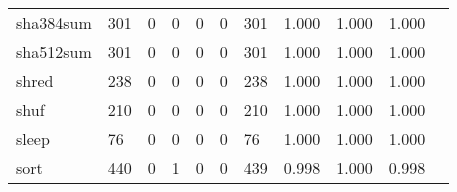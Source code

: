 \begin{longtable}{lp{1.2cm}p{1.2cm}p{1.2cm}p{1.2cm}p{1.2cm}p{1.2cm}p{1.2cm}p{1.2cm}p{1.2cm}p{1.2cm}}
sha384sum &                                   301 &                                                  0 &                                                  0 &                                                  0 &                                                  0 &                                                301 &                                              1.000 &                                              1.000 &                                              1.000 \\
sha512sum &                                   301 &                                                  0 &                                                  0 &                                                  0 &                                                  0 &                                                301 &                                              1.000 &                                              1.000 &                                              1.000 \\
shred     &                                   238 &                                                  0 &                                                  0 &                                                  0 &                                                  0 &                                                238 &                                              1.000 &                                              1.000 &                                              1.000 \\
shuf      &                                   210 &                                                  0 &                                                  0 &                                                  0 &                                                  0 &                                                210 &                                              1.000 &                                              1.000 &                                              1.000 \\
sleep     &                                    76 &                                                  0 &                                                  0 &                                                  0 &                                                  0 &                                                 76 &                                              1.000 &                                              1.000 &                                              1.000 \\
sort      &                                   440 &                                                  0 &                                                  1 &                                                  0 &                                                  0 &                                                439 &                                              0.998 &                                              1.000 &                                              0.998 \\

\end{longtable}
